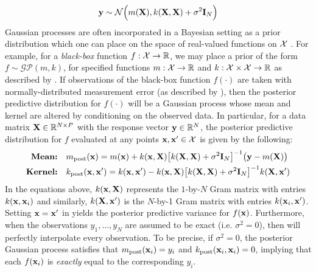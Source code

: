 \documentclass[10pt]{article}
\newcommand{\calGP}{\mathcal{GP}}
\begin{document}
\begin{equation}
\label{eq:GP-obs-distribution}
    \mathbf{y} \sim \mathcal{N}\Big(m(\mathbf{X}), k(\mathbf{X}, \mathbf{X}) + \sigma^{2}\mathbf{I}_{N}\Big)
\end{equation}
Gaussian processes are often incorporated in a Bayesian setting as a prior distribution which one can place on the space of real-valued functions on $\mathcal{X}$ \citep{Titsias-SVGP-2009,Alvarez-Vector-Kernels-2012}. For example, for a \emph{black-box} function $f: \mathcal{X} \to \mathbb{R}$, we may place a prior of the form $f \sim \calGP(m, k)$, for specified functions $m: \mathcal{X} \to \mathbb{R}$ and $k: \mathcal{X} \times \mathcal{X} \to \mathbb{R}$ as described by . If observations of the black-box function $f(\cdot)$ are taken with normally-distributed measurement error (as described by ), then the posterior predictive distribution for $f(\cdot)$ will be a Gaussian process whose mean and kernel are altered by conditioning on the observed data. In particular, for a data matrix $\mathbf{X} \in \mathbb{R}^{N \times P}$ with the response vector $\mathbf{y} \in \mathbb{R}^{N}$, the posterior predictive distribution for $f$ evaluated at any points $\mathbf{x}, \mathbf{x}' \in \mathcal{X}$ is given by the following:
\begin{subequations}
    \label{eq:GP-posterior}
    \begin{align}
        \textbf{Mean:} \quad & m_{\textrm{post}}(\bfx) = m(\bfx) + k(\bfx, \bfX)\big[k(\bfX, \bfX) + \sigma^{2}\bfI_{N}\big]^{-1}\big(\bfy - m(\bfX)\big)\label{eq:GP-post-mean}\\%
        \textbf{Kernel:} \quad & k_{\textrm{post}}(\bfx, \bfx') = k(\bfx, \bfx') - k(\bfx, \bfX)\big[k(\bfX, \bfX) + \sigma^{2}\bfI_{N}\big]^{-1}k(\bfX, \bfx')\label{eq:GP-post-kernel}
    \end{align}
\end{subequations}
In the equations above, $k(\mathbf{x}, \mathbf{X})$ represents the $1$-by-$N$ Gram matrix with entries $k(\mathbf{x}, \mathbf{x}_{i})$ and similarly, $k(\mathbf{X}, \mathbf{x}')$ is the $N$-by-1 Gram matrix with entries $k(\mathbf{x}_{i}, \mathbf{x}')$. Setting $\mathbf{x} = \mathbf{x}'$ in  yields the posterior predictive variance for $f(\mathbf{x})$. Furthermore, when the observations $y_{1}, \dots, y_{N}$ are assumed to be exact (i.e. $\sigma^2 = 0$), then  will perfectly interpolate every observation. To be precise, if $\sigma^{2} = 0$, the posterior Gaussian process satisfies that $m_{\textrm{post}}(\mathbf{x}_{i}) = y_{i}$ and $k_{\textrm{post}}(\mathbf{x}_{i}, \mathbf{x}_{i}) = 0$, implying that each $f(\mathbf{x}_{i})$ is \emph{exactly} equal to the corresponding $y_{i}$. 
\end{document}
